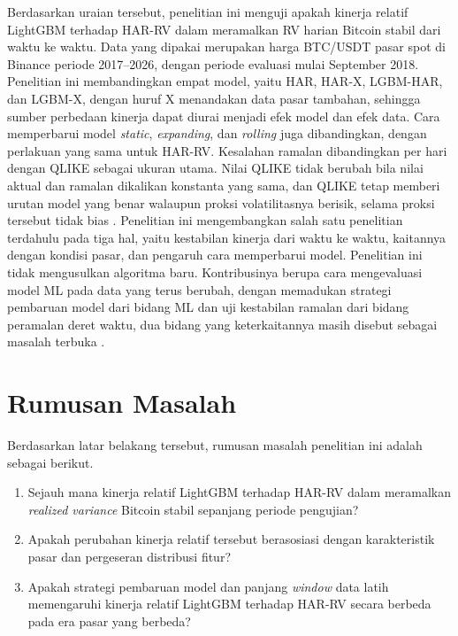 Berdasarkan uraian tersebut, penelitian ini menguji apakah kinerja relatif
LightGBM terhadap HAR-RV dalam meramalkan RV harian Bitcoin stabil dari waktu
ke waktu. Data yang dipakai merupakan harga BTC/USDT pasar spot di Binance
periode 2017--2026, dengan periode evaluasi mulai September 2018. Penelitian
ini membandingkan empat model, yaitu HAR, HAR-X, LGBM-HAR, dan LGBM-X, dengan
huruf X menandakan data pasar tambahan, sehingga sumber perbedaan kinerja
dapat diurai menjadi efek model dan efek data. Cara memperbarui model
\textit{static}, \textit{expanding}, dan \textit{rolling} juga dibandingkan,
dengan perlakuan yang sama untuk HAR-RV. Kesalahan ramalan dibandingkan per
hari dengan QLIKE sebagai ukuran utama. Nilai QLIKE tidak berubah bila nilai
aktual dan ramalan dikalikan konstanta yang sama, dan QLIKE tetap memberi
urutan model yang benar walaupun proksi volatilitasnya berisik, selama proksi
tersebut tidak bias \cite{patton2011}. Penelitian ini mengembangkan salah satu
penelitian terdahulu \cite{dudek2024} pada tiga hal, yaitu kestabilan kinerja
dari waktu ke waktu, kaitannya dengan kondisi pasar, dan pengaruh cara
memperbarui model. Penelitian ini tidak mengusulkan algoritma baru.
Kontribusinya berupa cara mengevaluasi model ML pada data yang terus berubah,
dengan memadukan strategi pembaruan model dari bidang ML dan uji kestabilan
ramalan dari bidang peramalan deret waktu, dua bidang yang keterkaitannya
masih disebut sebagai masalah terbuka \cite{suarez2023}.

\section{Rumusan Masalah}
\label{sec:rumusan}
Berdasarkan latar belakang tersebut, rumusan masalah penelitian ini adalah
sebagai berikut.
\begin{enumerate}
  \item Sejauh mana kinerja relatif LightGBM terhadap HAR-RV dalam meramalkan
        \textit{realized variance} Bitcoin stabil sepanjang periode pengujian?
  \item Apakah perubahan kinerja relatif tersebut berasosiasi dengan
        karakteristik pasar dan pergeseran distribusi fitur?
  \item Apakah strategi pembaruan model dan panjang \textit{window} data latih
        memengaruhi kinerja relatif LightGBM terhadap HAR-RV secara berbeda
        pada era pasar yang berbeda?
\end{enumerate}

